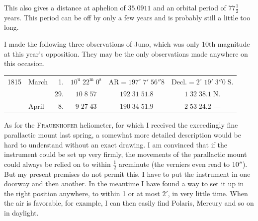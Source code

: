 \par\indent This also gives a distance at aphelion of $35.0911$ and an orbital period of $77\tfrac12$ years. This period can be off by only a few years and is probably still a little too long.

\par\indent I made the following three observations of Juno, which was only 10th magnitude at this year’s opposition. They may be the only observations made anywhere on this occasion.

\begin{center}\fontsize{9}{11}\selectfont\setlength{\tabcolsep}{2pt}\renewcommand{\arraystretch}{1.15}\begin{tabular}{llrccc}
1815 & March & 1. & $10^{\mathrm u}\;22^{\mathrm m}\;0^{\mathrm s}$ & $\mathrm{AR}=197^\circ\;7'\;56''8$ & $\mathrm{Decl.}=2^\circ\;19'\;3''0\;\mathrm{S.}$\\
 & & 29. & $10\;8\;57$ & $192\;31\;51.8$ & $1\;32\;38.1\;\mathrm{N.}$\\
 & April & 8. & $9\;27\;43$ & $190\;34\;51.9$ & $2\;53\;24.2$ ---\\
\end{tabular}\end{center}

\par\indent As for the \textsc{Frauenhofer} heliometer, for which I received the exceedingly fine parallactic mount last spring, a somewhat more detailed description would be hard to understand without an exact drawing. I am convinced that if the instrument could be set up very firmly, the movements of the parallactic mount could always be relied on to within $\tfrac12$ arcminute (the verniers even read to $10''$). But my present premises do not permit this. I have to put the instrument in one doorway and then another. In the meantime I have found a way to set it up in the right position anywhere, to within 1 or at most $2'$, in very little time. When the air is favorable, for example, I can then easily find Polaris, Mercury and so on in daylight.
